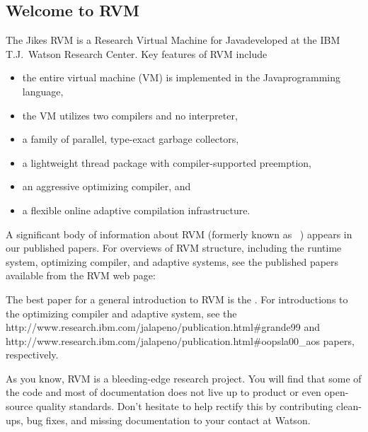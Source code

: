 \subsection {Welcome to RVM}

The Jikes RVM is a Research Virtual Machine for Java\trademark developed at the IBM T.J.\ Watson Research Center.  Key features of RVM include 
\begin{itemize}
\item the entire virtual machine (VM) is implemented in the
  Java\trademark  programming language,
\item the VM utilizes two compilers and no interpreter,
\item a family of parallel, type-exact garbage collectors,
\item a lightweight thread package with compiler-supported preemption,
\item an aggressive optimizing compiler, and 
\item a flexible online adaptive compilation infrastructure.
\end{itemize}

A significant body of information about RVM (formerly known as \jp\ ) appears in 
our published
papers.  For overviews of RVM structure, including the runtime system,
optimizing compiler, and adaptive systems, see the published papers
available from the RVM web page:
\begin{quote}
\end{quote}

The best paper for a general introduction to RVM is 
the 
.  
For introductions to the
optimizing compiler and adaptive system, see the 
{http://www.research.ibm.com/jalapeno/publication.html\#grande99}
 and 
{http://www.research.ibm.com/jalapeno/publication.html\#oopsla00\_aos}  
papers, respectively.

As you know, RVM is a bleeding-edge research project.  You will find that
some of the code and most of documentation does not live up to product or 
even open-source quality standards. Don't hesitate to help rectify this by
contributing clean-ups, bug fixes, and missing documentation to your
contact at Watson.  

